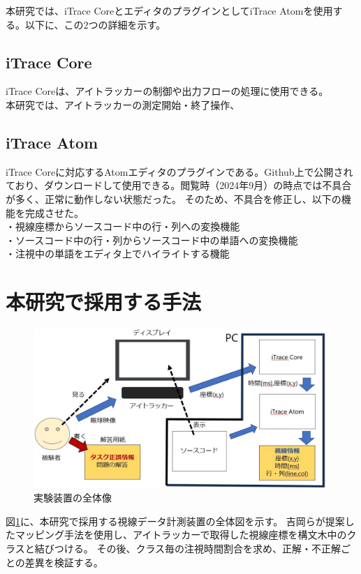 \documentclass[paper=a4paper,fontsize=11pt]{jlreq}
\begin{document}
    本研究では、iTrace CoreとエディタのプラグインとしてiTrace Atomを使用する。以下に、この2つの詳細を示す。

    \subsection{iTrace Core}
      iTrace Coreは、アイトラッカーの制御や出力フローの処理に使用できる。\\
      本研究では、アイトラッカーの測定開始・終了操作、

    \subsection{iTrace Atom}
      iTrace Coreに対応するAtomエディタのプラグインである。Github上で公開されており、ダウンロードして使用できる。閲覧時（2024年9月）の時点では不具合が多く、正常に動作しない状態だった。
      そのため、不具合を修正し、以下の機能を完成させた。\\
      ・視線座標からソースコード中の行・列への変換機能\\
      ・ソースコード中の行・列からソースコード中の単語への変換機能\\
      ・注視中の単語をエディタ上でハイライトする機能
  \clearpage

  \section{本研究で採用する手法}
    \begin{figure}[htbp]
      \centering
      \includegraphics[width=0.8\linewidth]{実験装置全体図.jpg}
      \caption{実験装置の全体像}
      \label{実験装置全体図}
    \end{figure}
    \FloatBarrier

    図\ref{実験装置全体図}に、本研究で採用する視線データ計測装置の全体図を示す。
    吉岡らが提案したマッピング手法を使用し、アイトラッカーで取得した視線座標を構文木中のクラスと結びつける。
    その後、クラス毎の注視時間割合を求め、正解・不正解ごとの差異を検証する。
  \clearpage
\end{document}
